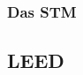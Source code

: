 \documentclass{beamer}
\begin{document}
\begin{frame}
\frametitle{Das STM}
\begin{figure}[H]
\centering
\sffamily

\end{figure}
\end{frame}



\subsection[Ergebnisse]{LEED}
\end{document}

